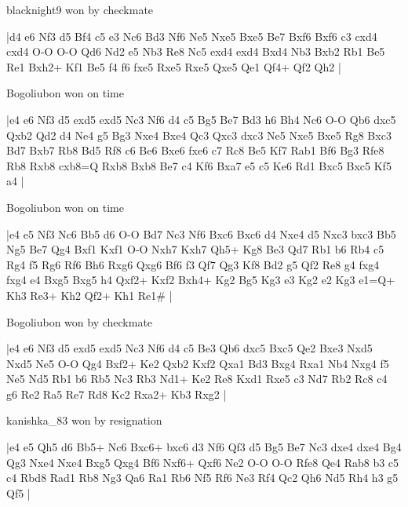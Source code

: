 \showboard

blacknight9 won by checkmate

\makegametitle
|d4 e6 Nf3 d5 Bf4 c5 e3 Nc6 Bd3 Nf6 Ne5 Nxe5 Bxe5 Be7 Bxf6 Bxf6 c3 cxd4 cxd4 O-O O-O Qd6 Nd2 e5 Nb3 Re8 Nc5 exd4 exd4 Bxd4 Nb3 Bxb2 Rb1 Be5 Re1 Bxh2+ Kf1 Be5 f4 f6 fxe5 Rxe5 Rxe5 Qxe5 Qe1 Qf4+ Qf2 Qh2  |

\showboard

Bogoliubon won on time

\makegametitle
|e4 e6 Nf3 d5 exd5 exd5 Nc3 Nf6 d4 c5 Bg5 Be7 Bd3 h6 Bh4 Nc6 O-O Qb6 dxc5 Qxb2 Qd2 d4 Ne4 g5 Bg3 Nxe4 Bxe4 Qc3 Qxc3 dxc3 Ne5 Nxe5 Bxe5 Rg8 Bxc3 Bd7 Bxb7 Rb8 Bd5 Rf8 c6 Be6 Bxe6 fxe6 c7 Rc8 Be5 Kf7 Rab1 Bf6 Bg3 Rfe8 Rb8 Rxb8 cxb8=Q Rxb8 Bxb8 Be7 c4 Kf6 Bxa7 e5 c5 Ke6 Rd1 Bxc5 Bxc5 Kf5 a4  |

\showboard

Bogoliubon won on time

\makegametitle
|e4 e5 Nf3 Nc6 Bb5 d6 O-O Bd7 Nc3 Nf6 Bxc6 Bxc6 d4 Nxe4 d5 Nxc3 bxc3 Bb5 Ng5 Be7 Qg4 Bxf1 Kxf1 O-O Nxh7 Kxh7 Qh5+ Kg8 Be3 Qd7 Rb1 b6 Rb4 c5 Rg4 f5 Rg6 Rf6 Bh6 Rxg6 Qxg6 Bf6 f3 Qf7 Qg3 Kf8 Bd2 g5 Qf2 Re8 g4 fxg4 fxg4 e4 Bxg5 Bxg5 h4 Qxf2+ Kxf2 Bxh4+ Kg2 Bg5 Kg3 e3 Kg2 e2 Kg3 e1=Q+ Kh3 Re3+ Kh2 Qf2+ Kh1 Re1\#  |

\showboard

Bogoliubon won by checkmate

\makegametitle
|e4 e6 Nf3 d5 exd5 exd5 Nc3 Nf6 d4 c5 Be3 Qb6 dxc5 Bxc5 Qe2 Bxe3 Nxd5 Nxd5 Ne5 O-O Qg4 Bxf2+ Ke2 Qxb2 Kxf2 Qxa1 Bd3 Bxg4 Rxa1 Nb4 Nxg4 f5 Ne5 Nd5 Rb1 b6 Rb5 Nc3 Rb3 Nd1+ Ke2 Re8 Kxd1 Rxe5 c3 Nd7 Rb2 Rc8 c4 g6 Re2 Ra5 Re7 Rd8 Kc2 Rxa2+ Kb3 Rxg2  |

\showboard

kanishka\_83 won by resignation

\makegametitle
|e4 e5 Qh5 d6 Bb5+ Nc6 Bxc6+ bxc6 d3 Nf6 Qf3 d5 Bg5 Be7 Nc3 dxe4 dxe4 Bg4 Qg3 Nxe4 Nxe4 Bxg5 Qxg4 Bf6 Nxf6+ Qxf6 Ne2 O-O O-O Rfe8 Qe4 Rab8 b3 c5 c4 Rbd8 Rad1 Rb8 Ng3 Qa6 Ra1 Rb6 Nf5 Rf6 Ne3 Rf4 Qc2 Qh6 Nd5 Rh4 h3 g5 Qf5  |


